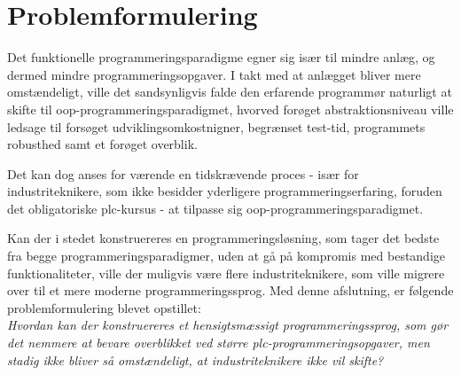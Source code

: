 \section{Problemformulering}
Det funktionelle programmeringsparadigme egner sig især til mindre anlæg, og dermed mindre programmeringsopgaver. I takt med at anlægget bliver mere omstændeligt, ville det sandsynligvis falde den erfarende programmør naturligt at skifte til \gls{oop}-programmeringsparadigmet, hvorved forøget abstraktionsniveau ville ledsage til forsøget udviklingsomkostnigner, begrænset test-tid, programmets robusthed samt et forøget overblik. 

Det kan dog anses for værende en tidskrævende proces - især for industriteknikere, som ikke besidder yderligere programmeringserfaring, foruden det obligatoriske \gls{plc}-kursus - at tilpasse sig \gls{oop}-programmeringsparadigmet\cite{dislikes_oop}. 

Kan der i stedet konstruereres en programmeringsløsning, som tager det bedste fra begge programmeringsparadigmer, uden at gå på kompromis med bestandige funktionaliteter, ville der muligvis være flere industriteknikere, som ville migrere over til et mere moderne programmeringssprog. Med denne afslutning, er følgende problemformulering blevet opstillet: \\

\noindent\textit{Hvordan kan der konstruereres et hensigtsmæssigt programmeringssprog, som gør det nemmere at bevare overblikket ved større \gls{plc}-programmeringsopgaver, men stadig ikke bliver så omstændeligt, at industriteknikere ikke vil skifte?}

